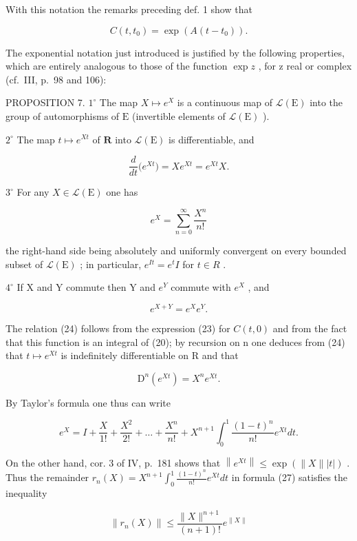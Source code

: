 With this notation the remarks preceding def. 1 show that

\[
C (t, t _ {0}) = \exp \left(A (t - t _ {0})\right).\tag{23}
\]

The exponential notation just introduced is justified by the following properties, which are entirely analogous to those of the function \(\exp z\) , for z real or complex (cf.~III, p.~98 and 106):

PROPOSITION 7. \(1^{\circ}\) The map \(X \mapsto e^{X}\) is a continuous map of \(\mathcal{L}(\mathrm{E})\) into the group of automorphisms of \(\mathrm{E}\) (invertible elements of \(\mathcal{L}(\mathrm{E})\) ).

\(2^{\circ}\) The map \(t\mapsto e^{Xt}\) of \(\mathbf{R}\) into \(\mathcal{L}(\mathrm{E})\) is differentiable, and

\[
\frac {d}{d t} \big (e ^ {X t} \big) = X e ^ {X t} = e ^ {X t} X.\tag{24}
\]

\(3^{\circ}\) For any \(X\in \mathcal{L}(\mathrm{E})\) one has

\[
e ^ {X} = \sum_ {n = 0} ^ {\infty} \frac {X ^ {n}}{n !}\tag{25}
\]

the right-hand side being absolutely and uniformly convergent on every bounded subset of \(\mathcal{L}(\mathrm{E})\) ; in particular, \(e^{It} = e^{t}I\) for \(t \in R\) .

\(4^{\circ}\) If X and Y commute then Y and \(e^{Y}\) commute with \(e^{X}\) , and

\[
e ^ {X + Y} = e ^ {X} e ^ {Y}.\tag{26}
\]

The relation (24) follows from the expression (23) for \(C(t,0)\) and from the fact that this function is an integral of (20); by recursion on n one deduces from (24) that \(t \mapsto e^{Xt}\) is indefinitely differentiable on R and that

\[
\mathrm{D} ^ {n} \left(e ^ {X t}\right) = X ^ {n} e ^ {X t}.
\]

By Taylor's formula one thus can write

\[
e ^ {X} = I + \frac {X}{1 !} + \frac {X ^ {2}}{2 !} + \dots + \frac {X ^ {n}}{n !} + X ^ {n + 1} \int_ {0} ^ {1} \frac {(1 - t) ^ {n}}{n !} e ^ {X t} d t.\tag{27}
\]

On the other hand, cor. 3 of IV, p.~181 shows that \(\left\| e^{Xt}\right\| \leqslant \exp \left(\| X\| |t|\right)\) . Thus the remainder \(r_n(X) = X^{n + 1}\int_0^1\frac{(1 - t)^n}{n!} e^{Xt}dt\) in formula (27) satisfies the inequality

\[
\| r _ {n} (X) \| \leqslant \frac {\| X \| ^ {n + 1}}{(n + 1) !} e ^ {\| X \|}
\]

